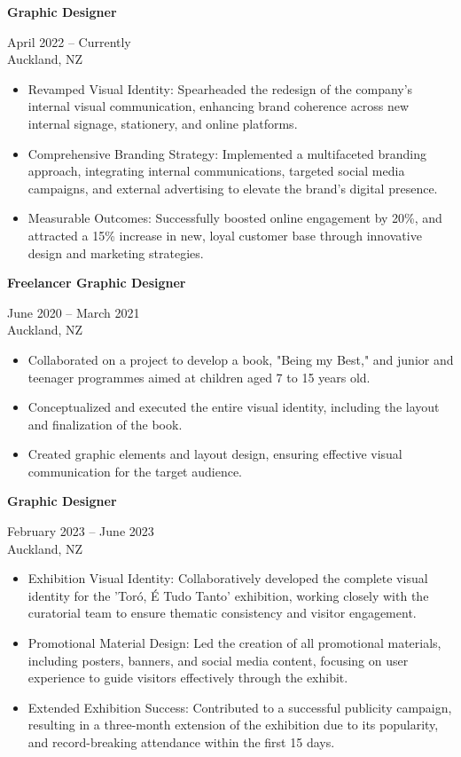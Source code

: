 \documentclass[10pt,a4paper,ragged2e,withhyper]{altacv}
\renewcommand{\cvevent}[4]{%
  \textbf{#1} %
  \hfill %
  \begin{minipage}[t]{.5\linewidth}
    \raggedleft %
    \small#3 %
    \\ %
    #4 %
  \end{minipage}
  \vspace{\baselineskip} %
}
\begin{document}
\divider

\cvevent{Graphic Designer}{Bonita Brazilian Beauty}{April 2022 -- Currently}{Auckland, NZ}
\begin{itemize}
  \item Revamped Visual Identity: Spearheaded the redesign of the company's internal visual communication, enhancing brand coherence across new internal signage, stationery, and online platforms.
  \item Comprehensive Branding Strategy: Implemented a multifaceted branding approach, integrating internal communications, targeted social media campaigns, and external advertising to elevate the brand's digital presence.
  \item Measurable Outcomes: Successfully boosted online engagement by 20\%, and attracted a 15\% increase in new, loyal customer base through innovative design and marketing strategies.
\end{itemize}

\divider

\cvevent{Freelancer Graphic Designer}{Sue Lyon}{June 2020 -- March 2021}{Auckland, NZ}
\begin{itemize}
  \item Collaborated on a project to develop a book, "Being my Best," and junior and teenager programmes aimed at children aged 7 to 15 years old.
  \item Conceptualized and executed the entire visual identity, including the layout and finalization of the book.
  \item Created graphic elements and layout design, ensuring effective visual communication for the target audience.
\end{itemize}

\divider

\cvevent{Graphic Designer}{Auckland War Memorial Museum}{February 2023 -- June 2023}{Auckland, NZ}
\begin{itemize}
  \item Exhibition Visual Identity: Collaboratively developed the complete visual identity for the 'Toró, É Tudo Tanto' exhibition, working closely with the curatorial team to ensure thematic consistency and visitor engagement.
  \item Promotional Material Design: Led the creation of all promotional materials, including posters, banners, and social media content, focusing on user experience to guide visitors effectively through the exhibit.
  \item Extended Exhibition Success: Contributed to a successful publicity campaign, resulting in a three-month extension of the exhibition due to its popularity, and record-breaking attendance within the first 15 days.
\end{itemize}
\end{document}
